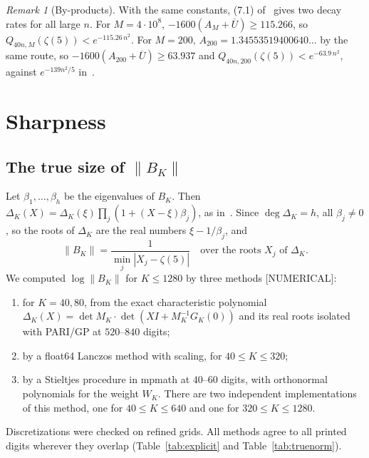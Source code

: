 \documentclass[11pt]{article}
\theoremstyle{remark}
\newtheorem{remark}{Remark}
\newcommand{\Ubar}{\overline{U}}
\begin{document}
\begin{remark}[By-products]
With the same constants, (7.1) of~\cite{F} gives two decay rates for all large $n$. For $M=4\cdot10^8$, $-1600(A_M+\Ubar)\ge115.266$, so $Q_{40n,M}(\zeta(5))<e^{-115.26\,n^2}$. For $M=200$, $A_{200}=1.34553519400640\ldots$ by the same route, so $-1600(A_{200}+\Ubar)\ge63.937$ and $Q_{40n,200}(\zeta(5))<e^{-63.9\,n^2}$, against $e^{-139n^2/5}$ in~\cite[(2.7)]{F}.
\end{remark}

\section{Sharpness}\label{sec:sharp}

\subsection{The true size of $\|B_K\|$}\label{sec:truenorm}

Let $\beta_1,\dots,\beta_h$ be the eigenvalues of $B_K$. Then $\Delta_K(X)=\Delta_K(\xi)\prod_j(1+(X-\xi)\beta_j)$, as in~\cite[App.~C.3]{F}. Since $\deg\Delta_K=h$, all $\beta_j\ne0$, so the roots of $\Delta_K$ are the real numbers $\xi-1/\beta_j$, and
\[
\|B_K\|=\frac1{\min_j|X_j-\zeta(5)|}\quad\text{over the roots }X_j\text{ of }\Delta_K .
\]
We computed $\log\|B_K\|$ for $K\le1280$ by three methods [NUMERICAL]:
\begin{enumerate}[label=(\roman*)]
\item for $K=40,80$, from the exact characteristic polynomial $\Delta_K(X)=\det M_K\cdot\det(XI+M_K^{-1}G_K(0))$ and its real roots isolated with PARI/GP at $520$--$840$ digits;
\item by a float64 Lanczos method with scaling, for $40\le K\le320$;
\item by a Stieltjes procedure in mpmath at $40$--$60$ digits, with orthonormal polynomials for the weight $W_K$. There are two independent implementations of this method, one for $40\le K\le640$ and one for $320\le K\le1280$.
\end{enumerate}
Discretizations were checked on refined grids. All methods agree to all printed digits wherever they overlap (Table~\ref{tab:explicit} and Table~\ref{tab:truenorm}).
\end{document}
